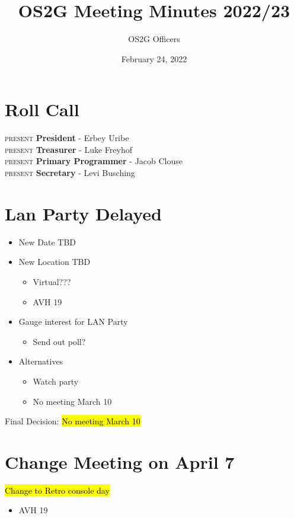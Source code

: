 \documentclass[12pt]{article}
\title{OS2G Meeting Minutes 2022/23}
\author{OS2G Officers}
\date{February 24, 2022}
\newcommand{\president}[0]{Erbey Uribe}
\newcommand{\treasurer}[0]{Luke Freyhof}
\newcommand{\primaryprogrammer}[0]{Jacob Clouse}
\newcommand{\secretary}[0]{Levi Busching}
\begin{document}
\maketitle

\section*{Roll Call}

\noindent \textsc{present} \textbf{President} - \president \\
\textsc{present} \textbf{Treasurer} - \treasurer \\
\textsc{present} \textbf{Primary Programmer} - \primaryprogrammer \\
\textsc{present} \textbf{Secretary} - \secretary \\

\section*{Lan Party Delayed}
   \begin{itemize}
       \item New Date TBD
       \item New Location TBD
       \begin{itemize}
           \item Virtual???
           \item AVH 19
       \end{itemize}
       \item Gauge interest for LAN Party
       \begin{itemize}
           \item Send out poll?
       \end{itemize}
       \item Alternatives
       \begin{itemize}
           \item Watch party
           \item No meeting March 10
       \end{itemize}
   \end{itemize}
Final Decision: \hl{No meeting March 10}

\section*{Change Meeting on April 7}
\hl{Change to Retro console day}
   \begin{itemize}
       \item AVH 19
   \end{itemize}
\end{document}
